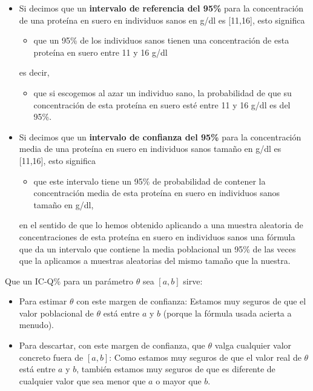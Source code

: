 \documentclass[
  spanish,
  letterpaper,
  DIV=11,
  numbers=noendperiod]{scrreprt}
\providecommand{\tightlist}{%
  \setlength{\itemsep}{0pt}\setlength{\parskip}{0pt}}
\begin{document}
\begin{itemize}
\item
  Si decimos que un \textbf{intervalo de referencia del 95\%} para la
  concentración de una proteína en suero en individuos sanos en g/dl es
  {[}11,16{]}, esto significa

  \begin{itemize}
  \tightlist
  \item
    que un 95\% de los individuos sanos tienen una concentración de esta
    proteína en suero entre 11 y 16 g/dl
  \end{itemize}

  es decir,

  \begin{itemize}
  \tightlist
  \item
    que si escogemos al azar un individuo sano, la probabilidad de que
    su concentración de esta proteína en suero esté entre 11 y 16 g/dl
    es del 95\%.
  \end{itemize}
\item
  Si decimos que un \textbf{intervalo de confianza del 95\%} para la
  concentración media de una proteína en suero en individuos sanos
  tamaño en g/dl es {[}11,16{]}, esto significa

  \begin{itemize}
  \tightlist
  \item
    que este intervalo tiene un 95\% de probabilidad de contener la
    concentración media de esta proteína en suero en individuos sanos
    tamaño en g/dl,
  \end{itemize}

  en el sentido de que lo hemos obtenido aplicando a una muestra
  aleatoria de concentraciones de esta proteína en suero en individuos
  sanos una fórmula que da un intervalo que contiene la media
  poblacional un 95\% de las veces que la aplicamos a muestras
  aleatorias del mismo tamaño que la nuestra.
\end{itemize}

Que un IC-Q\% para un parámetro \(\theta\) sea \([a,b]\) sirve:

\begin{itemize}
\item
  Para estimar \(\theta\) con este margen de confianza: Estamos muy
  seguros de que el valor poblacional de \(\theta\) está entre \(a\) y
  \(b\) (porque la fórmula usada acierta a menudo).
\item
  Para descartar, con este margen de confianza, que \(\theta\) valga
  cualquier valor concreto fuera de \([a,b]\): Como estamos muy seguros
  de que el valor real de \(\theta\) está entre \(a\) y \(b\), también
  estamos muy seguros de que es diferente de cualquier valor que sea
  menor que \(a\) o mayor que \(b\).
\end{itemize}
\end{document}
